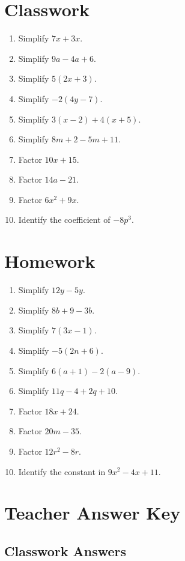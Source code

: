 \documentclass[11pt]{book}
\begin{document}
\section{Classwork}

\begin{enumerate}
\item Simplify \(7x+3x\).
\item Simplify \(9a-4a+6\).
\item Simplify \(5(2x+3)\).
\item Simplify \(-2(4y-7)\).
\item Simplify \(3(x-2)+4(x+5)\).
\item Simplify \(8m+2-5m+11\).
\item Factor \(10x+15\).
\item Factor \(14a-21\).
\item Factor \(6x^2+9x\).
\item Identify the coefficient of \(-8p^3\).
\end{enumerate}

\section{Homework}

\begin{enumerate}
\item Simplify \(12y-5y\).
\item Simplify \(8b+9-3b\).
\item Simplify \(7(3x-1)\).
\item Simplify \(-5(2n+6)\).
\item Simplify \(6(a+1)-2(a-9)\).
\item Simplify \(11q-4+2q+10\).
\item Factor \(18x+24\).
\item Factor \(20m-35\).
\item Factor \(12r^2-8r\).
\item Identify the constant in \(9x^2-4x+11\).
\end{enumerate}

\section{Teacher Answer Key}

\subsection{Classwork Answers}
\end{document}
